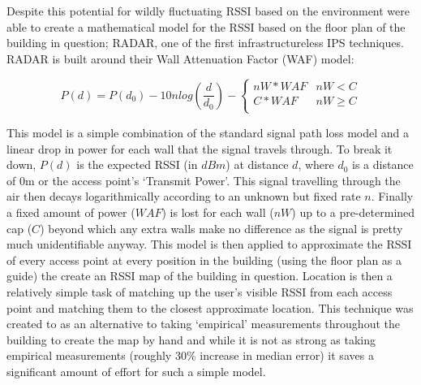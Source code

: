 \documentclass{UoYCSproject}
\begin{document}
                Despite this potential for wildly fluctuating RSSI based on the environment \citet{bahl2000radar} were able to create a mathematical model for the RSSI based on the floor plan of the building in question; RADAR, one of the first infrastructureless IPS techniques. RADAR is built around their Wall Attenuation Factor (WAF) model:
            
                \begin{equation} \label{eq:WAF}
                    P(d) = P(d_0) - 10nlog\left(\frac{d}{d_0}\right) - \left\lbrace 
                        \begin{matrix}
                            nW * WAF & nW < C \\
                            C * WAF  & nW \geq C \\
                        \end{matrix}
                    \right.
                \end{equation}
            
                This model is a simple combination of the standard signal path loss model and a linear drop in power for each wall that the signal travels through. To break it down, $P(d)$ is the expected RSSI (in $dBm$) at distance $d$, where $d_0$ is a distance of $0$m or the access point's `Transmit Power'. This signal travelling through the air then decays logarithmically according to an unknown but fixed rate $n$. Finally a fixed amount of power ($WAF$) is lost for each wall ($nW$) up to a pre-determined cap ($C$) beyond which any extra walls make no difference as the signal is pretty much unidentifiable anyway. This model is then applied to approximate the RSSI of every access point at every position in the building (using the floor plan as a guide) the create an RSSI map of the building in question. Location is then a relatively simple task of matching up the user's visible RSSI from each access point and matching them to the closest approximate location. This technique was created to as an alternative to taking `empirical' measurements throughout the building to create the map by hand and while it is not as strong as taking empirical measurements (roughly 30\% increase in median error) it saves a significant amount of effort for such a simple model.
                
\end{document}
